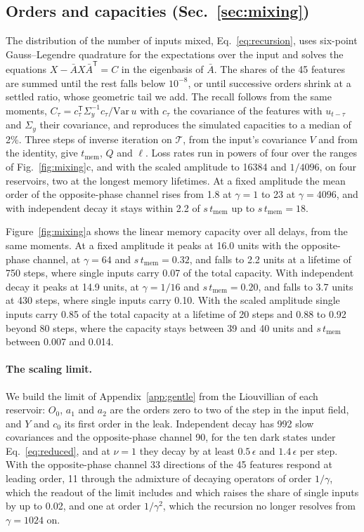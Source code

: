 \subsection{Orders and capacities (Sec.~\ref{sec:mixing})}
\label{app:num-capacity}
The distribution of the number of inputs mixed, Eq.~\eqref{eq:recursion}, uses six-point Gauss--Legendre quadrature
for the expectations over the input and solves the equations $X-\bar AX\bar A^{\mathsf T}=C$ in the eigenbasis of
$\bar A$. The shares of the 45 features are summed until the rest falls below $10^{-8}$, or until successive orders
shrink at a settled ratio, whose geometric tail we add. The recall follows from the same moments,
$C_\tau=c_\tau^{\mathsf T}\Sigma_y^{-1}c_\tau/\mathrm{Var}\,u$ with $c_\tau$ the covariance of the features with
$u_{t-\tau}$ and $\Sigma_y$ their covariance, and reproduces the simulated capacities to a median of 2\%. Three steps of
inverse iteration on $\mathcal T$, from the input's covariance $V$ and from the identity, give $t_{\mathrm{mem}}$, $Q$
and $\ell$. Loss rates run in powers of four over the ranges of Fig.~\ref{fig:mixing}c, and with the scaled amplitude to
16384 and $1/4096$, on four reservoirs, two at the longest memory lifetimes. At a fixed amplitude the mean order of the
opposite-phase channel rises from 1.8 at $\gamma=1$ to 23 at $\gamma=4096$, and with independent decay it stays within
2.2 of $s\,t_{\mathrm{mem}}$ up to $s\,t_{\mathrm{mem}}=18$.

Figure~\ref{fig:mixing}a shows the linear memory capacity over all delays, from the same moments. At a fixed
amplitude it peaks at 16.0 units with the opposite-phase channel, at $\gamma=64$ and $s\,t_{\mathrm{mem}}=0.32$, and
falls to 2.2 units at a lifetime of 750 steps, where single inputs carry 0.07 of the total capacity. With independent
decay it peaks at 14.9 units, at $\gamma=1/16$ and $s\,t_{\mathrm{mem}}=0.20$, and falls to 3.7 units at 430 steps,
where single inputs carry 0.10. With the scaled amplitude single inputs carry 0.85 of the total capacity at a
lifetime of 20 steps and 0.88 to 0.92 beyond 80 steps, where the capacity stays between 39 and 40 units and
$s\,t_{\mathrm{mem}}$ between 0.007 and 0.014.

\paragraph{The scaling limit.}
We build the limit of Appendix~\ref{app:gentle} from the Liouvillian of each reservoir: $O_0$, $a_1$ and $a_2$ are the
orders zero to two of the step in the input field, and $Y$ and $c_0$ its first order in the leak. Independent decay
has 992 slow covariances and the opposite-phase channel 90, for the ten dark states under Eq.~\eqref{eq:reduced}, and
at $\nu=1$ they decay by at least $0.5\,\epsilon$ and $1.4\,\epsilon$ per step. With the opposite-phase channel 33
directions of the 45 features respond at leading order, 11 through the admixture of decaying operators of order
$1/\gamma$, which the readout of the limit includes and which raises the share of single inputs by up to 0.02, and
one at order $1/\gamma^2$, which the recursion no longer resolves from $\gamma=1024$ on.

